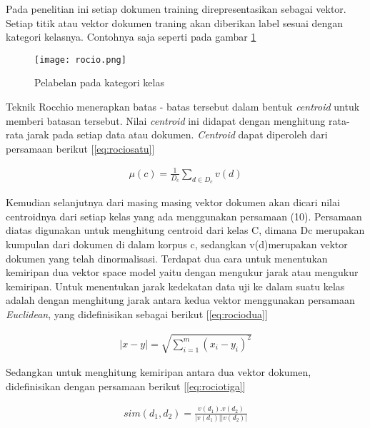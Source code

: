 Pada penelitian ini setiap dokumen training direpresentasikan sebagai vektor. Setiap titik atau vektor dokumen traning akan diberikan label sesuai dengan kategori kelasnya. Contohnya saja seperti pada gambar \ref{fig:rocio} 

\begin{figure}[h!] %
	\centering
	\texttt{[image: rocio.png]}
	\caption{Pelabelan pada kategori kelas}
	\label{fig:rocio}
\end{figure}

Teknik Rocchio menerapkan batas - batas tersebut dalam bentuk\textit{ centroid} untuk memberi batasan tersebut. Nilai \textit{centroid} ini didapat dengan menghitung rata- rata jarak pada setiap data atau dokumen. \textit{Centroid} dapat diperoleh dari persamaan berikut [\ref{eq:rociosatu}]

\begin{equation}
\begin{split}
\mu (c) = \frac{1}{D_{c}} \sum \limits_{d\in D_c} v(d)
\label{eq:rociosatu}
\end{split}
\end{equation}

Kemudian selanjutnya dari masing masing vektor dokumen akan dicari nilai centroidnya dari setiap kelas yang ada menggunakan persamaan (10). Persamaan diatas digunakan untuk menghitung centroid dari kelas C, dimana Dc merupakan kumpulan dari dokumen di dalam korpus c, sedangkan v(d)merupakan vektor dokumen yang telah dinormalisasi. Terdapat dua cara untuk menentukan kemiripan dua vektor space model yaitu dengan mengukur jarak atau mengukur kemiripan. Untuk menentukan jarak kedekatan data uji ke dalam suatu kelas adalah dengan menghitung jarak antara kedua vektor menggunakan persamaan \textit{Euclidean}, yang didefinisikan sebagai berikut [\ref{eq:rociodua}]

\begin{equation}
\begin{split}
|x - y | = \sqrt{\sum_{i=1}^{m}(x_i - y_i)^2}
\label{eq:rociodua}
\end{split}
\end{equation}

Sedangkan untuk menghitung kemiripan antara dua vektor dokumen, didefinisikan dengan persamaan berikut [\ref{eq:rociotiga}]

\begin{equation}
\begin{split}
sim(d_1, d_2) = \frac{v(d_1).v(d_2)}{|v(d_1)||v(d_2)|}
\label{eq:rociotiga}
\end{split}
\end{equation}

